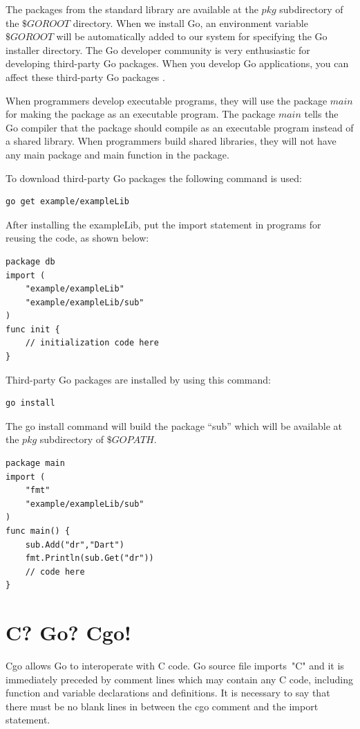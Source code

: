 \documentclass[
  twoside, 12pt, 
  printed, %
  notable,   %
  lof,     %
  lot,     %
]{fithesis3}
\begin{document}
The packages from the standard library are available at the $pkg$ subdirectory of the $\$GOROOT$ 
directory. When we install Go, an environment variable $\$GOROOT$ will be automatically added to 
our system for specifying the Go installer directory. The Go developer community is very 
enthusiastic for developing third-party Go packages. When you develop Go applications, you can 
affect these third-party Go packages \cite{stack_2014}.

When programmers develop executable programs, they will use the package $main$ for making the 
package as an executable program. The package $main$ tells the Go compiler that the package 
should compile as an executable program instead of a shared library. When programmers build 
shared libraries, they will not have any main package and main function in the package.

To download third-party Go packages the following command is used: 
\begin{lstlisting}
go get example/exampleLib
\end{lstlisting}
After installing the exampleLib, put the import statement in programs for reusing the code, as 
shown below:
\begin{lstlisting}
package db
import (
	"example/exampleLib"
	"example/exampleLib/sub"
)
func init {
	// initialization code here    
}
\end{lstlisting}
Third-party Go packages are installed by using this command: 
\begin{lstlisting}
go install
\end{lstlisting}
The go install command will build the package “sub” which will be available at the $pkg$ 
subdirectory of $\$GOPATH$.
\begin{lstlisting}
package main
import (
	"fmt"
	"example/exampleLib/sub"
)
func main() {
    sub.Add("dr","Dart")
    fmt.Println(sub.Get("dr"))
    // code here    
}
\end{lstlisting}

\section{C? Go? Cgo!}\label{cgo}
Cgo allows Go to interoperate with C code. Go source file imports~"C" and it is immediately 
preceded by comment lines which may contain any C code, including function and variable 
declarations and definitions. It is necessary to say that there must be no blank lines in 
between the cgo comment and the import statement. 
\end{document}
